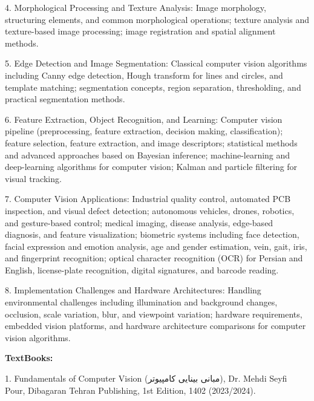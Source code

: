 \documentclass[12pt,a4paper]{article}
\begin{document}
4. Morphological Processing and Texture Analysis: Image morphology, structuring elements, and common morphological operations; texture analysis and texture-based image processing; image registration and spatial alignment methods.\par
5. Edge Detection and Image Segmentation: Classical computer vision algorithms including Canny edge detection, Hough transform for lines and circles, and template matching; segmentation concepts, region separation, thresholding, and practical segmentation methods.\par
6. Feature Extraction, Object Recognition, and Learning: Computer vision pipeline (preprocessing, feature extraction, decision making, classification); feature selection, feature extraction, and image descriptors; statistical methods and advanced approaches based on Bayesian inference; machine-learning and deep-learning algorithms for computer vision; Kalman and particle filtering for visual tracking.\par
7. Computer Vision Applications: Industrial quality control, automated PCB inspection, and visual defect detection; autonomous vehicles, drones, robotics, and gesture-based control; medical imaging, disease analysis, edge-based diagnosis, and feature visualization; biometric systems including face detection, facial expression and emotion analysis, age and gender estimation, vein, gait, iris, and fingerprint recognition; optical character recognition (OCR) for Persian and English, license-plate recognition, digital signatures, and barcode reading.\par
8. Implementation Challenges and Hardware Architectures: Handling environmental challenges including illumination and background changes, occlusion, scale variation, blur, and viewpoint variation; hardware requirements, embedded vision platforms, and hardware architecture comparisons for computer vision algorithms.\par\vspace{4pt}
\textbf{TextBooks:}\par\vspace{2pt}
1. Fundamentals of Computer Vision (مبانی بینایی کامپیوتر), Dr. Mehdi Seyfi Pour, Dibagaran Tehran Publishing, 1st Edition, 1402 (2023/2024).\par
\vspace{4pt}
\end{document}
